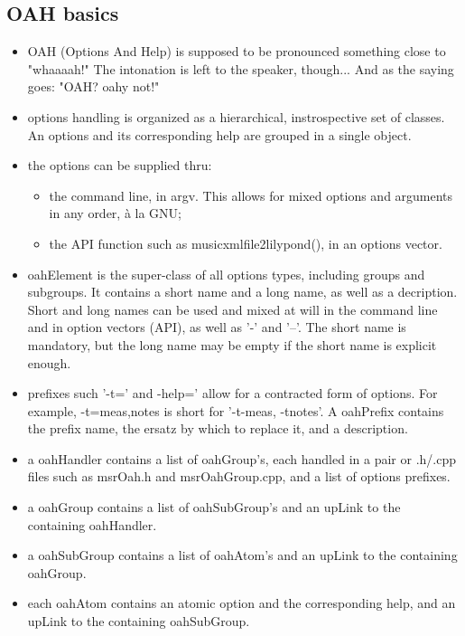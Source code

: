 \subsection{OAH basics}

\begin{itemize}
\item OAH (Options And Help) is supposed to be pronounced something close to "whaaaah!"
    The intonation is left to the speaker, though...
    And as the saying goes: "OAH? oahy not!"

\item options handling is organized as a hierarchical, instrospective set of classes.
    An options and its corresponding help are grouped in a single object.

\item the options can be supplied thru:
  \begin{itemize}
    \item the command line, in argv.
        This allows for mixed options and arguments in any order, à la GNU;
    \item the API function such as musicxmlfile2lilypond(), in an options vector.
  \end{itemize}

\item oahElement is the super-class of all options types, including groups and subgroups.
    It contains a short name and a long name, as well as a decription.
    Short and long names can be used and mixed at will in the command line
    and in option vectors (API),
    as well as '-' and '--'.
    The short name is mandatory, but the long name may be empty
    if the short name is explicit enough.

\item prefixes such '-t=' and -help=' allow for a contracted form of options.
    For example, -t=meas,notes is short for '-t-meas, -tnotes'.
    A oahPrefix contains the prefix name, the ersatz by which to replace it,
    and a description.

\item a oahHandler contains a list of oahGroup's, each handled
    in a pair or .h/.cpp files such as msrOah.h and msrOahGroup.cpp,
    and a list of options prefixes.

\item a oahGroup contains a list of oahSubGroup's
    and an upLink to the containing oahHandler.

\item a oahSubGroup contains a list of oahAtom's
    and an upLink to the containing oahGroup.

\item each oahAtom contains an atomic option and the corresponding help,
    and an upLink to the containing oahSubGroup.

\end{itemize}



